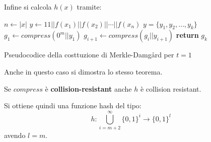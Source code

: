 \documentclass[a4paper,12pt, oneside]{book}
\begin{document}
Infine si calcola $h(x)$ tramite:
\begin{algorithm}[H]
  \begin{algorithmic}
    \State $n\gets |x|$   
    \State $y\gets 11||f(x_1)||f(x_2)||\cdots||f(x_n)$
    \State $y=\{y_1,y_2,\ldots, y_k\}$
    \State $g_1\gets compress(0^m||y_1)$
    \State $g_{i+1}\gets compress(g_i||y_{i+1})$
    \EndFor
    \State \textbf{return} $g_{k}$
    \EndFunction
  \end{algorithmic}
  \caption{Pseudocodice della costtuzione di Merkle-Damg{\aa}rd per $t=1$}
\end{algorithm}
Anche in questo caso si dimostra lo stesso teorema.
\begin{teorema}
  Se $compress$ è \textbf{collision-resistant} anche $h$ è collision resistant.
\end{teorema}
\noindent
Si ottiene quindi una funzione hash del tipo:
\[h:\bigcup_{i=m+2}^\infty\{0,1\}^i\to\{0,1\}^l\]
avendo $l=m$.
\end{document}
